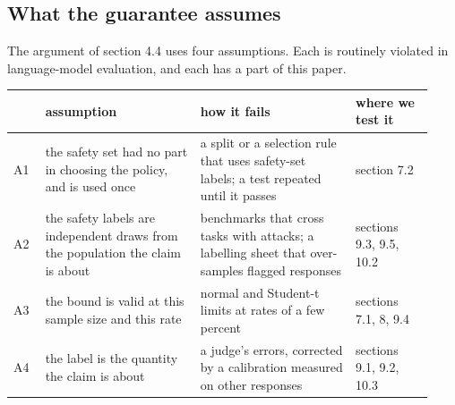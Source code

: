 \documentclass[11pt]{article}
\begin{document}
\subsection{What the guarantee assumes}

The argument of section 4.4 uses four assumptions. Each is routinely violated in language-model evaluation, and each has a part of this paper.


\begingroup\footnotesize\setlength{\tabcolsep}{4pt}
\begin{longtable}{@{}>{\raggedright\arraybackslash}p{0.070\linewidth}>{\raggedright\arraybackslash}p{0.344\linewidth}>{\raggedright\arraybackslash}p{0.344\linewidth}>{\raggedright\arraybackslash}p{0.170\linewidth}@{}}
\toprule
 & \textbf{\hspace{0pt}assumption} & \textbf{\hspace{0pt}how it fails} & \textbf{\hspace{0pt}where we test it} \\
\midrule
\endhead
\bottomrule
\endlastfoot
\hspace{0pt}A1 & \hspace{0pt}the safety set had no part in choosing the policy, and is used once & \hspace{0pt}a split or a selection rule that uses safety-set labels; a test repeated until it passes & \hspace{0pt}section 7.2 \\
\hspace{0pt}A2 & \hspace{0pt}the safety labels are independent draws from the population the claim is about & \hspace{0pt}benchmarks that cross tasks with attacks; a labelling sheet that over-samples flagged responses & \hspace{0pt}sections 9.3, 9.5, 10.2 \\
\hspace{0pt}A3 & \hspace{0pt}the bound is valid at this sample size and this rate & \hspace{0pt}normal and Student-t limits at rates of a few percent & \hspace{0pt}sections 7.1, 8, 9.4 \\
\hspace{0pt}A4 & \hspace{0pt}the label is the quantity the claim is about & \hspace{0pt}a judge's errors, corrected by a calibration measured on other responses & \hspace{0pt}sections 9.1, 9.2, 10.3 \\
\end{longtable}
\endgroup
\end{document}
